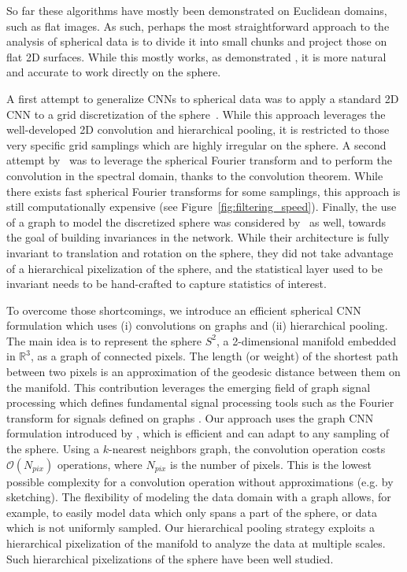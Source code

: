 \documentclass[final,twocolumn,3p,times,authoryear]{elsarticle}
\newcommand{\nati}[1]{{\color[rgb]{.1,.6,.1}{#1}}}
\newcommand{\todo}[1]{{\color[rgb]{.6,.1,.6}{#1}}}
\newcommand{\figref}[1]{Figure~\ref{fig:#1}}
\newcommand{\1}{\b{1}}              %
\newcommand{\0}{\b{0}}              %
\begin{document}
So far these algorithms have mostly been demonstrated on Euclidean domains, such as flat images.
As such, perhaps the most straightforward approach to the analysis of spherical data is to divide it into small chunks and project those on flat 2D surfaces.
While this mostly works, as demonstrated \todo{in ??? for example}, \nati{@Tomek, do you have a citation for that? Otherwise, we need to reformulate this.} \nati{Cite the paper of Janis?} it is more natural and accurate to work directly on the sphere.

A first attempt to generalize CNNs to spherical data was to apply a standard 2D CNN to a grid discretization of the sphere~\citep{boomsma2017spherical}. While this approach leverages the well-developed 2D convolution and hierarchical pooling, it is restricted to those very specific grid samplings which are highly irregular on the sphere.
A second attempt by~\citet{cohen2018spherical} was to leverage the spherical Fourier transform and to perform the convolution in the spectral domain, thanks to the convolution theorem. While there exists fast spherical Fourier transforms for some samplings, this approach is still computationally expensive (see \figref{filtering_speed}).
Finally, the use of a graph to model the discretized sphere was considered by~\citet{khasanova2017graphomni} as well, towards the goal of building invariances in the network. While their architecture is fully invariant to translation and rotation on the sphere, they did not take advantage of a hierarchical pixelization of the sphere, and the statistical layer used to be invariant needs to be hand-crafted to capture statistics of interest.

To overcome those shortcomings, we introduce an efficient spherical CNN formulation which uses (i) convolutions on graphs and (ii) hierarchical pooling. The main idea is to represent the sphere $S^2$, a 2-dimensional manifold embedded in $\mathbb{R}^3$, as a graph of connected pixels. The length (or weight) of the shortest path between two pixels is an approximation of the geodesic distance between them on the manifold.
This contribution leverages the emerging field of graph signal processing which defines fundamental signal processing tools such as the Fourier transform for signals defined on graphs \citep{shuman2013emerging}.
Our approach uses the graph CNN formulation introduced by \citet{defferrard2016convolutional}, which is efficient and can adapt to any sampling of the sphere. Using a $k$-nearest neighbors graph, the convolution operation costs $\mathcal{O}(N_{pix})$ operations, where $N_{pix}$ is the number of pixels. This is the lowest possible complexity for a convolution operation without approximations (e.g. by sketching).
The flexibility of modeling the data domain with a graph allows, for example, to easily model data which only spans a part of the sphere, or data which is not uniformly sampled.
Our hierarchical pooling strategy exploits a hierarchical pixelization of the manifold to analyze the data at multiple scales.
Such hierarchical pixelizations of the sphere have been well studied.
\end{document}
